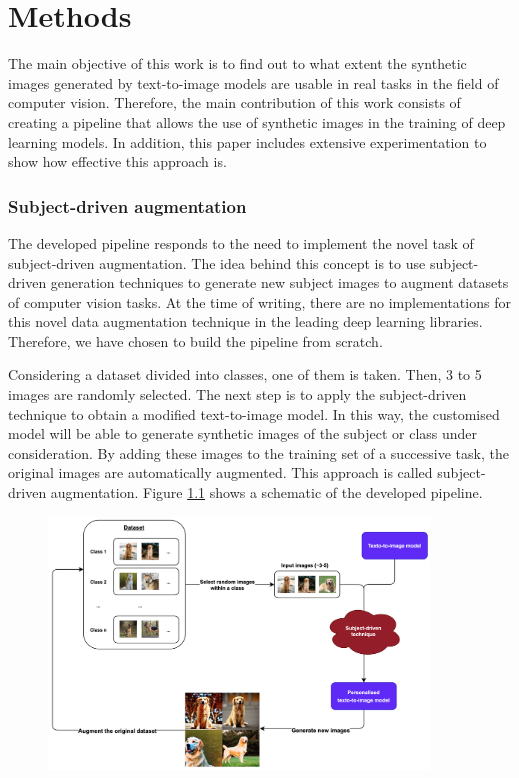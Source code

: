 \chapter{Methods} \label{sec:methods}

The main objective of this work is to find out to what extent the synthetic images generated by text-to-image models are usable in real tasks in the field of computer vision. Therefore, the main contribution of this work consists of creating a pipeline that allows the use of synthetic images in the training of deep learning models. In addition, this paper includes extensive experimentation to show how effective this approach is.

\subsection{Subject-driven augmentation}

The developed pipeline responds to the need to implement the novel task of subject-driven augmentation. The idea behind this concept is to use subject-driven generation techniques to generate new subject images to augment datasets of computer vision tasks. At the time of writing, there are no implementations for this novel data augmentation technique in the leading deep learning libraries. Therefore, we have chosen to build the pipeline from scratch.

Considering a dataset divided into classes, one of them is taken. Then, 3 to 5 images are randomly selected. The next step is to apply the subject-driven technique to obtain a modified text-to-image model. In this way, the customised model will be able to generate synthetic images of the subject or class under consideration. By adding these images to the training set of a successive task, the original images are automatically augmented. This approach is called subject-driven augmentation. Figure \ref{fig:subjectDrivenP} shows a schematic of the developed pipeline.

\begin{figure}
    \centering
    \includegraphics[width=0.9\textwidth]{Pictures/subjectDrivenP.png} 
    \caption{}
    \label{fig:subjectDrivenP}
\end{figure}

